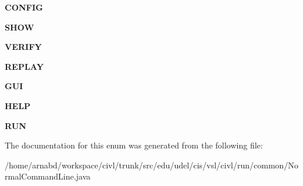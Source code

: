 \begin{DoxyCompactItemize}
\item 
\hypertarget{enumedu_1_1udel_1_1cis_1_1vsl_1_1civl_1_1run_1_1common_1_1NormalCommandLine_1_1NormalCommandKind_abe681790fb2d44053badbef1290a1de0}{}{\bfseries C\+O\+N\+F\+I\+G}\label{enumedu_1_1udel_1_1cis_1_1vsl_1_1civl_1_1run_1_1common_1_1NormalCommandLine_1_1NormalCommandKind_abe681790fb2d44053badbef1290a1de0}

\item 
\hypertarget{enumedu_1_1udel_1_1cis_1_1vsl_1_1civl_1_1run_1_1common_1_1NormalCommandLine_1_1NormalCommandKind_a813ac3bc950f2b938f696d5b70ed7c22}{}{\bfseries S\+H\+O\+W}\label{enumedu_1_1udel_1_1cis_1_1vsl_1_1civl_1_1run_1_1common_1_1NormalCommandLine_1_1NormalCommandKind_a813ac3bc950f2b938f696d5b70ed7c22}

\item 
\hypertarget{enumedu_1_1udel_1_1cis_1_1vsl_1_1civl_1_1run_1_1common_1_1NormalCommandLine_1_1NormalCommandKind_a3bea433e0a3dc7971ce6f71ac38f6a05}{}{\bfseries V\+E\+R\+I\+F\+Y}\label{enumedu_1_1udel_1_1cis_1_1vsl_1_1civl_1_1run_1_1common_1_1NormalCommandLine_1_1NormalCommandKind_a3bea433e0a3dc7971ce6f71ac38f6a05}

\item 
\hypertarget{enumedu_1_1udel_1_1cis_1_1vsl_1_1civl_1_1run_1_1common_1_1NormalCommandLine_1_1NormalCommandKind_a265e85e90d7751ca9604beb83f499676}{}{\bfseries R\+E\+P\+L\+A\+Y}\label{enumedu_1_1udel_1_1cis_1_1vsl_1_1civl_1_1run_1_1common_1_1NormalCommandLine_1_1NormalCommandKind_a265e85e90d7751ca9604beb83f499676}

\item 
\hypertarget{enumedu_1_1udel_1_1cis_1_1vsl_1_1civl_1_1run_1_1common_1_1NormalCommandLine_1_1NormalCommandKind_a04cfa1fb55d40adefa90a8fd04a3e2a9}{}{\bfseries G\+U\+I}\label{enumedu_1_1udel_1_1cis_1_1vsl_1_1civl_1_1run_1_1common_1_1NormalCommandLine_1_1NormalCommandKind_a04cfa1fb55d40adefa90a8fd04a3e2a9}

\item 
\hypertarget{enumedu_1_1udel_1_1cis_1_1vsl_1_1civl_1_1run_1_1common_1_1NormalCommandLine_1_1NormalCommandKind_a13419161307f63c2e2858adb96f45178}{}{\bfseries H\+E\+L\+P}\label{enumedu_1_1udel_1_1cis_1_1vsl_1_1civl_1_1run_1_1common_1_1NormalCommandLine_1_1NormalCommandKind_a13419161307f63c2e2858adb96f45178}

\item 
\hypertarget{enumedu_1_1udel_1_1cis_1_1vsl_1_1civl_1_1run_1_1common_1_1NormalCommandLine_1_1NormalCommandKind_a88c36b2cfd81770eca3ed63fa7c9357c}{}{\bfseries R\+U\+N}\label{enumedu_1_1udel_1_1cis_1_1vsl_1_1civl_1_1run_1_1common_1_1NormalCommandLine_1_1NormalCommandKind_a88c36b2cfd81770eca3ed63fa7c9357c}

\end{DoxyCompactItemize}


The documentation for this enum was generated from the following file\+:\begin{DoxyCompactItemize}
\item 
/home/arnabd/workspace/civl/trunk/src/edu/udel/cis/vsl/civl/run/common/Normal\+Command\+Line.\+java\end{DoxyCompactItemize}
